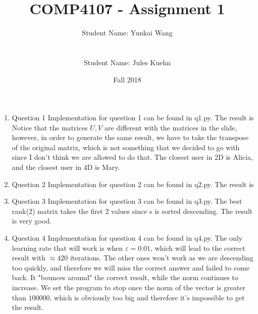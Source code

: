 \documentclass[11pt]{article}
\title{COMP4107 - Assignment 1}
\author{Student Name: Yunkai Wang\\
\text{Student Number: 100968473}\\\\
Student Name: Jules Kuehn\\
\text{Student Number: 100661464}}
\date{Fall 2018}
\begin{document}
\maketitle
\begin{enumerate}

\item Question 1\newline
Implementation for question 1 can be found in q1.py. The result is\\

Notice that the matrices $U, V$ are different with the matrices in the slide, however, in order to generate the same result, we have to take the transpose of the original matrix, which is not something that we decided to go with since I don't think we are allowed to do that. The closest user in 2D is Alicia, and the closest user in 4D is Mary.

\item Question 2\newline
Implementation for question 2 can be found in q2.py. The result is\\


\item Question 3\newline
Implementation for question 3 can be found in q3.py. The best rank(2) matrix takes the first 2 values since s is sorted descending. The result is very good.\\


\item Question 4\newline
Implementation for question 4 can be found in q4.py. The only learning rate that will work is when $ε = 0.01$, which will lead to the correct result with $\approx 420$ iterations. The other ones won't work as we are descending too quickly, and therefore we will miss the correct answer and failed to come back. It "bounces around" the correct result, while the norm continues to increase. We set the program to stop once the norm of the vector is greater than $100000$, which is obviously too big and therefore it's impossible to get the result.



\end{enumerate}
\end{document}
